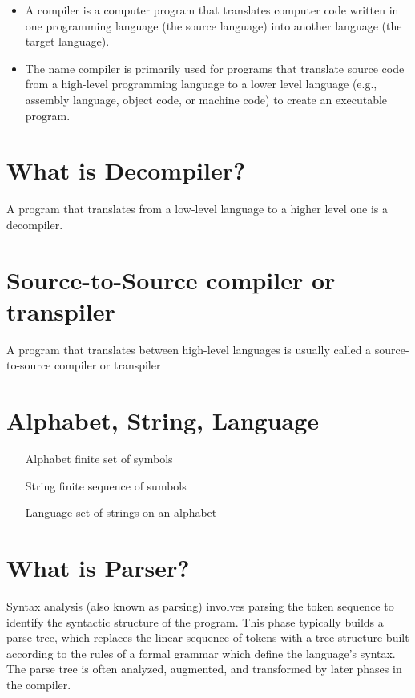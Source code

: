 \documentclass[12pt]{article}
\begin{document}
\begin{itemize}

	\item A compiler is a computer program that translates computer code written in one programming language (the source language) into another language (the target language). 
	
	\item The name compiler is primarily used for programs that translate source code from a high-level programming language to a lower level language (e.g., assembly language, object code, or machine code) to create an executable program.

\end{itemize}



\section{What is Decompiler?}

A program that translates from a low-level language to a higher level one is a decompiler.


\section{Source-to-Source compiler or transpiler}

A program that translates between high-level languages is usually called a source-to-source compiler or transpiler

\section{Alphabet, String, Language}

\begin{itemize}
	\item [Alphabet] finite set of symbols
	\item [String] finite sequence of sumbols
	\item [Language] set of strings on an alphabet 
\end{itemize}

\section{What is Parser?}

Syntax analysis (also known as parsing) involves parsing the token sequence to identify the syntactic structure of the program. This phase typically builds a parse tree, which replaces the linear sequence of tokens with a tree structure built according to the rules of a formal grammar which define the language's syntax. The parse tree is often analyzed, augmented, and transformed by later phases in the compiler.
\end{document}

